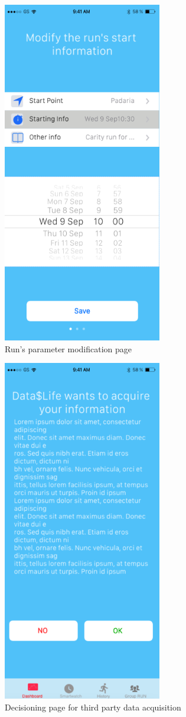 \documentclass{article}
\begin{document}
	\begin{figure}[!h]
	 	\centering
		\includegraphics[height=15cm,keepaspectratio]{Figures/Screen03}
		\caption{Run's parameter modification page}
	\end{figure}\newpage
	
	\begin{figure}[!h]
	 	\centering
		\includegraphics[height=15cm,keepaspectratio]{Figures/Screen04}
		\caption{Decisioning page for third party data acquisition}
	\end{figure}
	
\end{document}
